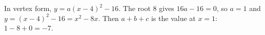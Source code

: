 In vertex form, $y=a(x-4)^2-16$. The root $8$ gives $16a-16=0$, so $a=1$ and $y=(x-4)^2-16=x^2-8x$. Then $a+b+c$ is the value at $x=1$: $1-8+0=\boxed{-7}$.
